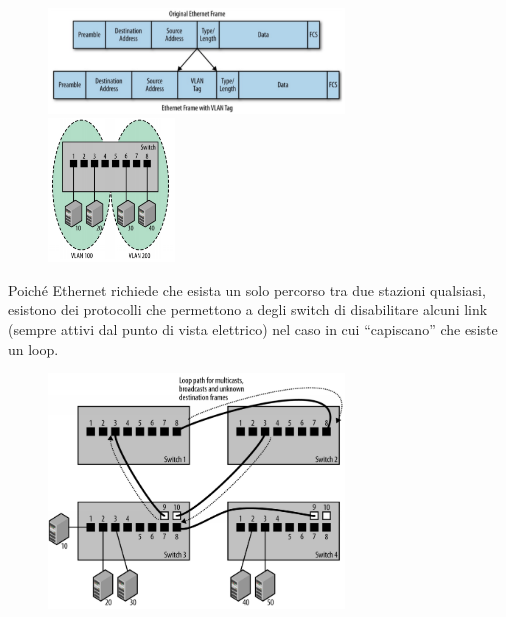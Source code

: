 \begin{figure}[H]
    \centering
    \includegraphics[width=0.7\textwidth]{immagini/VLAN_tag.png}
    \includegraphics[width=0.3\textwidth]{immagini/VLAN_domain.png}
\end{figure}

\noindent Poiché Ethernet richiede che esista un solo percorso tra due stazioni qualsiasi, esistono dei protocolli che permettono a degli switch di disabilitare alcuni link (sempre attivi dal punto di vista elettrico) nel caso in cui ``capiscano'' che esiste un loop.

\begin{figure}[H]
    \centering
    \includegraphics[width=0.7\textwidth]{immagini/Loop_path.png}
\end{figure}
